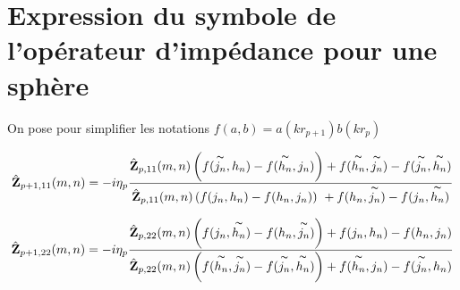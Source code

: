 \section{Expression du symbole de l'opérateur d'impédance pour une sphère}
\label{sec:annex:imp_sphere}



On pose pour simplifier les notations \(f(a,b)=a(kr_{p+1})b(kr_p)\)

\begin{equation}
      \hat{\mathbf{Z}}_{p+1,11}(m,n) = -i\eta_p
        \dfrac{\hat{\mathbf{Z}}_{p,11}(m,n) \left( f(\overset{\thicksim}{j_n},h_n) - f(\overset{\thicksim}{h_n},j_n) \right) + f(\overset{\thicksim}{h_n},\overset{\thicksim}{j_n}) - f(\overset{\thicksim}{j_n},\overset{\thicksim}{h_n})}{\hat{\mathbf{Z}}_{p,11}(m,n) \left( f(j_n,h_n) - f(h_n,j_n) \right) \\ + f(h_n,\overset{\thicksim}{j_n}) - f(j_n,\overset{\thicksim}{h_n})}
\end{equation}

\begin{equation}
      \hat{\mathbf{Z}}_{p+1,22}(m,n) = -i\eta_p
      \dfrac{\hat{\mathbf{Z}}_{p,22}(m,n) \left( f(j_n,\overset{\thicksim}{h_n}) - f(h_n,\overset{\thicksim}{j_n}) \right) + f(j_n,h_n) - f(h_n,j_n) }{\hat{\mathbf{Z}}_{p,22}(m,n) \left( f(\overset{\thicksim}{h_n},\overset{\thicksim}{j_n}) - f(\overset{\thicksim}{j_n},\overset{\thicksim}{h_n}) \right) + f(\overset{\thicksim}{h_n},j_n) - f(\overset{\thicksim}{j_n},h_n)}
\end{equation}